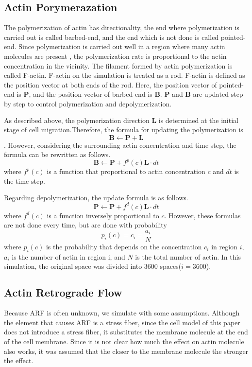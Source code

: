\documentclass[a4paper,12pt]{book}
\begin{document}
\subsection{Actin Porymerazation}
The polymerization of actin has directionality, the end where polymerization is carried out is called barbed-end, and the end which is not done is called pointed-end. Since polymerization is carried out well in a region where many actin molecules are present , the polymerization rate is proportional to the actin concentration in the vicinity.  The filament formed by actin polymerization is called F-actin. F-actin on the simulation is treated as a rod. F-actin is defined as the position vector at both ends of the rod. Here, the position vector of pointed-end is $\bm{P}$, and the position vector of barbed-end is $\bm{B}$. $\bm{P}$ and $\bm{B}$ are updated step by step to control polymerization and depolymerization.

As described above, the polymerization direction $\bm{L}$ is determined at the initial stage of cell migration.Therefore, the formula for updating the polymerization is \[\bm{B} \gets \bm{P} + \bm{L}\]. However, considering the surrounding actin concentration and time step, the formula can be rewritten as follows.
\begin{equation}
\bm{B} \gets \bm{P} + f^p(c)\bm{L} \cdot dt
\end{equation}
where $f^p(c)$ is a function that  proportional to actin concentration $c$ and $dt$ is the time step.

Regarding depolymerization, the update formula is as follows.
\begin{equation}
\bm{P} \gets \bm{P} + f^d(c)\bm{L} \cdot dt
\end{equation}
where  $f^d(c)$ is a function inversely proportional to $c$. However, these formulas are not done every time, but are done with probability \[p_i(c) = c_i = \frac{a_i}{N}\] where $p_i(c)$ is the probability that depends on the concentration $c_i$ in region $i$, $a_i$ is the number of actin in region i, and $N$ is the total number of actin. In this simulation, the original space was divided into 3600 spaces($i=3600$).



\subsection{Actin Retrograde Flow}
Because ARF is often unknown, we simulate with some assumptions. Although the element that causes ARF is a stress fiber, since the cell model of this paper does not introduce a stress fiber, it substitutes the membrane molecule at the end of the cell membrane. Since it is not clear how much the effect on actin molecule also works, it was assumed that the closer to the membrane molecule the stronger the effect.
\end{document}
